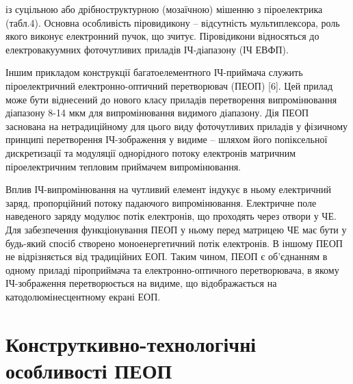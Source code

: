 \documentclass[a4paper,14pt]{extreport}
\begin{document}
із суцільною або дрібноструктурною (мозаїчною) мішенню з піроелектрика (табл.4). Основна особливість піровидикону – відсутність
мультиплексора, роль якого виконує електронний пучок, що зчитує. Піровідикони відносяться до електровакуумних фоточутливих приладів ІЧ-діапазону (ІЧ ЕВФП).
\begin{figure}[h!]

\label{ris2}
\end{figure}


Іншим прикладом конструкції багатоелементного ІЧ-приймача
служить піроелектричний електронно-оптичний перетворювач
(ПЕОП) [6]. Цей прилад може бути віднесений до нового класу приладів перетворення випромінювання діапазону 8-14 мкм для випромінювання видимого діапазону. Дія ПЕОП заснована на нетрадиційному для
цього виду фоточутливих приладів у фізичному принципі перетворення ІЧ-зображення у видиме – шляхом його попіксельної
дискретизації та модуляції однорідного потоку електронів матричним піроелектричним тепловим приймачем випромінювання.\par

Вплив ІЧ-випромінювання на чутливий елемент індукує в ньому електричний заряд, пропорційний потоку падаючого
випромінювання. Електричне поле наведеного заряду модулює потік
електронів, що проходять через отвори у ЧЕ. Для забезпечення
функціонування ПЕОП у ньому перед матрицею ЧЕ має бути у будь-який спосіб створено моноенергетичний потік електронів.
В іншому ПЕОП не відрізняється від традиційних ЕОП. Таким чином, ПЕОП є об'єднанням в одному приладі піроприймача та електронно-оптичного перетворювача, в якому
ІЧ-зображення перетворюється на видиме, що відображається на катодолюмінесцентному екрані ЕОП.

\chapter{Конструткивно-технологічні особливості ПЕОП}\par
\end{document}
